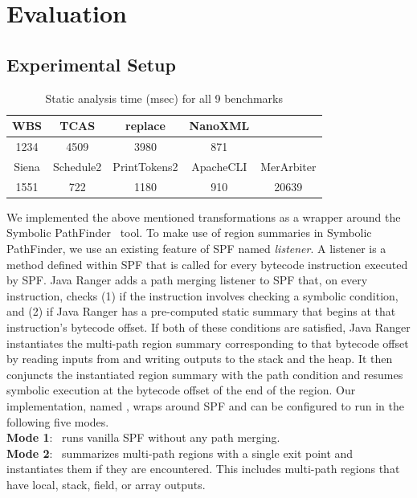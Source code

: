 \section{Evaluation}
\label{sec:results}
\subsection{Experimental Setup}
\begin{table}[]
    \begin{tabular}{@{}ccccc@{}}
        \toprule
        WBS   & TCAS      & replace      & NanoXML   &            \\ \midrule
        1234  & 4509      & 3980         & 871       &            \\ \midrule
        Siena & Schedule2 & PrintTokens2 & ApacheCLI & MerArbiter \\ \midrule
        1551  & 722       & 1180         & 910       & 20639      \\ \bottomrule
    \end{tabular}
    \caption{Static analysis time (msec) for all 9 benchmarks}
    \label{table:static-analysis-time}
\end{table}
%
We implemented the above mentioned transformations as a wrapper around the Symbolic PathFinder~\cite{spf} tool.
%
To make use of region summaries in Symbolic PathFinder, we use an existing feature of SPF named \textit{listener}.
%
A listener is a method defined within SPF that is called for every bytecode instruction executed by SPF.
%
Java Ranger adds a path merging listener to SPF that, on every instruction, checks (1) if the instruction involves
checking a symbolic condition, and (2) if Java Ranger has a pre-computed static summary that begins at that
instruction\rq s bytecode offset.
%
If both of these conditions are satisfied, Java Ranger instantiates the multi-path region summary corresponding to that
bytecode offset by reading inputs from and writing outputs to the stack and the heap.
%
It then conjuncts the instantiated region summary with the path condition and resumes symbolic execution at the
bytecode offset of the end of the region.
%
Our implementation, named \tool, wraps around SPF and can be configured to run in the following five modes.\\
%
\textbf{Mode 1}: \tool\ runs vanilla SPF without any path merging.\\
%
\textbf{Mode 2}: \tool\ summarizes multi-path regions with a single exit point and instantiates them if they are encountered.
This includes multi-path regions that have local, stack, field, or array outputs.
